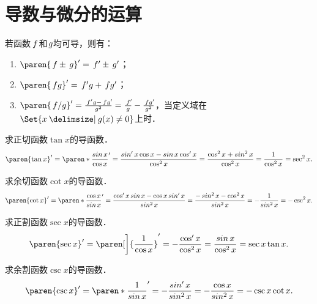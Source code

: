 \section{导数与微分的运算}

\begin{theorem*}
  \label{thm:deriv4ops}
  若函数\(\,f\mkern2mu\)和\(\mkern1mu g\)均可导，则有：
  \begin{enumerate}
    \renewcommand{\labelenumi}{\enumparen{\arabic{enumi}}}
  \item \(\paren{\,f \pm \,g}' = \,f' \pm \,g'\)；
  \item \(\paren{\,fg}' = \,f'g + \,fg'\)；
  \item \(\paren{\,f/g}' = \frac{\,f'g - \,fg'\!}{g^2} = \frac{\,f'\!}{g} - \frac{\,fg'\!}{g^2}\)，当定义域在\(\Set{x \mid g(x) \ne 0}\)上时．
  \end{enumerate}
\end{theorem*}

\begin{example*}
  求正切函数\(\tan x\)的导函数．
  \begin{equation*}
    \paren{\tan x}'
    = \paren*{\frac{\sin x}{\cos x}}'
    = \frac{\sin' x \cos x - \sin x \cos' x}{\cos^2 x}
    = \frac{\cos^2 x + \sin^2 x}{\cos^2 x}
    = \frac{1}{\cos^2 x}
    = \sec^2 x.
  \end{equation*}
\end{example*}

\begin{example*}
  求余切函数\(\cot x\)的导函数．
  \begin{equation*}
    \paren{\cot x}'
    = \paren*{\frac{\cos x}{\sin x}}'
    = \frac{\cos' x \sin x - \cos x \sin' x}{\sin^2 x}
    = \frac{-\sin^2 x - \cos^2 x}{\sin^2 x}
    = -\frac{1}{\sin^2 x}
    = -\csc^2 x.
  \end{equation*}
\end{example*}

\begin{example*}
  求正割函数\(\sec x\)的导函数．
  \begin{equation*}
    \paren{\sec x}'
    = \paren[\bigg]{\frac{1}{\cos x}}'
    = -\frac{\cos' x}{\cos^2 x}
    = \frac{\sin x}{\cos^2 x}
    = \sec x \tan x.
  \end{equation*}
\end{example*}

\begin{example*}
  求余割函数\(\csc x\)的导函数．
  \begin{equation*}
    \paren{\csc x}'
    = \paren*{\frac{1}{\sin x}}'
    = -\frac{\sin' x}{\sin^2 x}
    = -\frac{\cos x}{\sin^2 x}
    = -\csc x \cot x.
  \end{equation*}
\end{example*}

